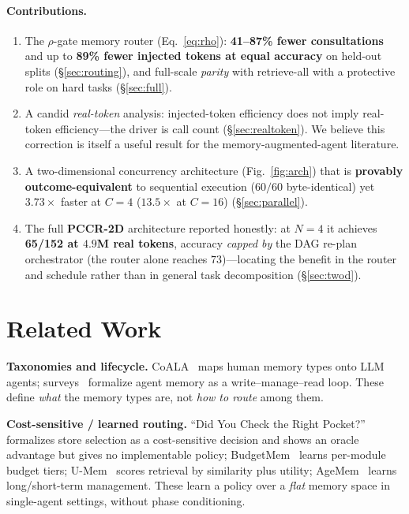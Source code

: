 \documentclass[10pt,twocolumn]{article}
\begin{document}
\paragraph{Contributions.}
\begin{enumerate}\itemsep1pt
\item The $\rho$-gate memory router (Eq.~\ref{eq:rho}): \textbf{41--87\% fewer consultations} and up
to \textbf{89\% fewer injected tokens at equal accuracy} on held-out splits (\S\ref{sec:routing}),
and full-scale \emph{parity} with retrieve-all with a protective role on hard tasks (\S\ref{sec:full}).
\item A candid \emph{real-token} analysis: injected-token efficiency does not imply real-token
efficiency---the driver is call count (\S\ref{sec:realtoken}). We believe this correction is itself a
useful result for the memory-augmented-agent literature.
\item A two-dimensional concurrency architecture (Fig.~\ref{fig:arch}) that is \textbf{provably
outcome-equivalent} to sequential execution ($60/60$ byte-identical) yet $3.73\times$ faster at
$C{=}4$ ($13.5\times$ at $C{=}16$) (\S\ref{sec:parallel}).
\item The full \textbf{PCCR-2D} architecture reported honestly: at $N{=}4$ it achieves
\textbf{65/152 at $4.9$M real tokens}, accuracy \emph{capped by} the DAG re-plan orchestrator (the
router alone reaches $73$)---locating the benefit in the router and schedule rather than in general
task decomposition (\S\ref{sec:twod}).
\end{enumerate}

\section{Related Work}\label{sec:related}
\textbf{Taxonomies and lifecycle.} CoALA~\cite{coala} maps human memory types onto LLM agents;
surveys~\cite{survey1,survey2} formalize agent memory as a write--manage--read loop. These define
\emph{what} the memory types are, not \emph{how to route} among them.

\textbf{Cost-sensitive / learned routing.} ``Did You Check the Right Pocket?''~\cite{pocket}
formalizes store selection as a cost-sensitive decision and shows an oracle advantage but gives no
implementable policy; BudgetMem~\cite{budgetmem} learns per-module budget tiers; U-Mem~\cite{umem}
scores retrieval by similarity plus utility; AgeMem~\cite{agemem} learns long/short-term management.
These learn a policy over a \emph{flat} memory space in single-agent settings, without phase
conditioning.
\end{document}
